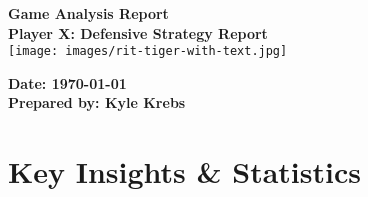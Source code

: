 \documentclass[a4paper,12pt]{article}
\begin{document}
\begin{titlepage}
    \centering
    {\Huge \textbf{Game Analysis Report}}\\[1.5cm]
    
    {\Large \textbf{Player X: Defensive Strategy Report}}\\[2cm]
    
    \texttt{[image: images/rit-tiger-with-text.jpg]} %
    
    \vfill
    
    \textbf{Date: \today}\\[1cm]
    \textbf{Prepared by: Kyle Krebs}
\end{titlepage}

\section*{Key Insights \& Statistics}

\vspace{1em}
\end{document}
